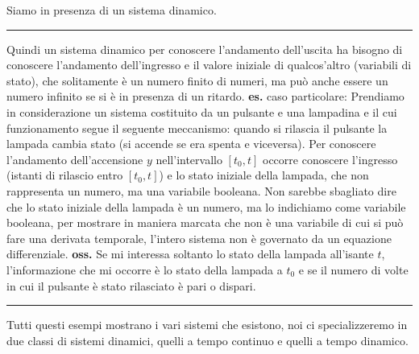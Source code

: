 Siamo in presenza di un sistema dinamico.\newline
\rule{\textwidth}{0,4pt}\newline
\newline
Quindi un sistema dinamico per conoscere l'andamento dell'uscita ha bisogno di conoscere l'andamento dell'ingresso e il valore iniziale di qualcos'altro (variabili di stato), che solitamente è un numero finito di numeri, ma può anche essere un numero infinito se si è in presenza di un ritardo.\newline
\newline
\textbf{es.} caso particolare:\newline
Prendiamo in considerazione un sistema costituito da un pulsante e una lampadina e il cui funzionamento segue il seguente meccanismo: quando si rilascia il pulsante la lampada cambia stato (si accende se era spenta e viceversa).\newline
Per conoscere l'andamento dell'accensione $y$ nell'intervallo $[t_0,t]$ occorre conoscere l'ingresso (istanti di rilascio entro $[t_0,t]$) e lo stato iniziale della lampada, che non rappresenta un numero, ma una variabile booleana. Non sarebbe sbagliato dire che lo stato iniziale della lampada è un numero, ma lo indichiamo come variabile booleana, per mostrare in maniera marcata che non è una variabile di cui si può fare una derivata temporale, l'intero sistema non è governato da un equazione differenziale.\newline
\textbf{oss.} Se mi interessa soltanto lo stato della lampada all'isante $t$, l'informazione che mi occorre è lo stato della lampada a $t_0$ e se il numero di volte in cui il pulsante è stato rilasciato è pari o dispari.\newline
\rule{\textwidth}{0,4pt}\newline
\newline
Tutti questi esempi mostrano i vari sistemi che esistono, noi ci specializzeremo in due classi di sistemi dinamici, quelli a tempo continuo e quelli a tempo dinamico.
